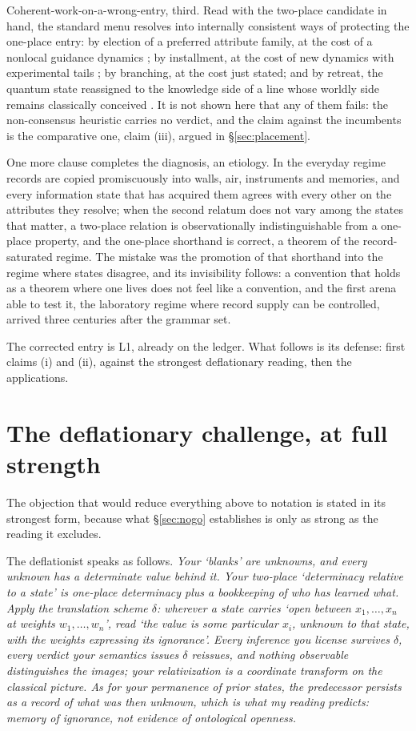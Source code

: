 Coherent-work-on-a-wrong-entry, third. Read with the two-place candidate in hand, the standard menu resolves into internally consistent ways of protecting the one-place entry: by election of a preferred attribute family, at the cost of a nonlocal guidance dynamics \cite{bohm1952suggested}; by installment, at the cost of new dynamics with experimental tails \cite{ghirardi1986unified}; by branching, at the cost just stated; and by retreat, the quantum state reassigned to the knowledge side of a line whose worldly side remains classically conceived \cite{spekkens2007evidence}. It is not shown here that any of them fails: the non-consensus heuristic carries no verdict, and the claim against the incumbents is the comparative one, claim (iii), argued in \S\ref{sec:placement}.

One more clause completes the diagnosis, an etiology. In the everyday regime records are copied promiscuously into walls, air, instruments and memories, and every information state that has acquired them agrees with every other on the attributes they resolve; when the second relatum does not vary among the states that matter, a two-place relation is observationally indistinguishable from a one-place property, and the one-place shorthand is correct, a theorem of the record-saturated regime. The mistake was the promotion of that shorthand into the regime where states disagree, and its invisibility follows: a convention that holds as a theorem where one lives does not feel like a convention, and the first arena able to test it, the laboratory regime where record supply can be controlled, arrived three centuries after the grammar set.

The corrected entry is L1, already on the ledger. What follows is its defense: first claims (i) and (ii), against the strongest deflationary reading, then the applications.

\section{The deflationary challenge, at full strength}\label{sec:deflation}

The objection that would reduce everything above to notation is stated in its strongest form, because what \S\ref{sec:nogo} establishes is only as strong as the reading it excludes.

The deflationist speaks as follows. \emph{Your `blanks' are unknowns, and every unknown has a determinate value behind it. Your two-place `determinacy relative to a state' is one-place determinacy plus a bookkeeping of who has learned what. Apply the translation scheme $\delta$: wherever a state carries `open between $x_1, \dots, x_n$ at weights $w_1, \dots, w_n$', read `the value is some particular $x_i$, unknown to that state, with the weights expressing its ignorance'. Every inference you license survives $\delta$, every verdict your semantics issues $\delta$ reissues, and nothing observable distinguishes the images; your relativization is a coordinate transform on the classical picture. As for your permanence of prior states, the predecessor persists as a record of what was then unknown, which is what my reading predicts: memory of ignorance, not evidence of ontological openness.}

